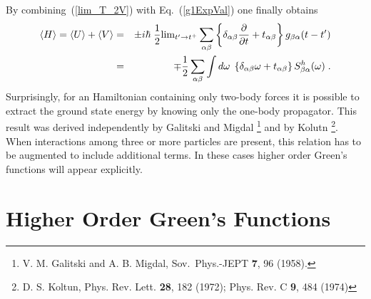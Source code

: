 By combining~(\ref{lim_T_2V}) with Eq.~(\ref{g1ExpVal}) one finally obtains
\begin{eqnarray}
 \langle H \rangle = \langle U \rangle + \langle V \rangle  &=&
  \pm  i\hbar  \; \frac{1}{2} \hbox{lim}_{t' \rightarrow t^+} \sum_{\alpha \beta} 
    \left\{ \delta_{\alpha \beta}  \frac{\partial}{\partial t}  + t_{\alpha \beta} \right\}
      g_{\beta \alpha }(t - t')
 \nonumber \\
   &=& \mp  \frac{1}{2} \sum_{\alpha \beta} \int d\omega \; \left\{ \delta_{\alpha \beta}\omega + t_{\alpha \beta} \right\}
      S^h_{\beta \alpha }(\omega) \; .
\label{dgdt_U_2V}
\end{eqnarray}
Surprisingly, for an Hamiltonian containing only two-body forces it is possible to extract the ground state energy by knowing only the one-body propagator. This result  was derived independently by Galitski and Migdal%
\footnote{V. M. Galitski and A. B. Migdal, Sov.~Phys.-JEPT {\bf 7}, 96 (1958).}
and by Kolutn%
\footnote{D. S. Koltun, Phys. Rev. Lett. {\bf 28}, 182 (1972); Phys. Rev. C {\bf 9}, 484 (1974)}.
When interactions among three or more particles are present, this relation has to be augmented to include additional terms. In these cases higher order Green's functions will appear explicitly.


\section{Higher Order Green's Functions}

